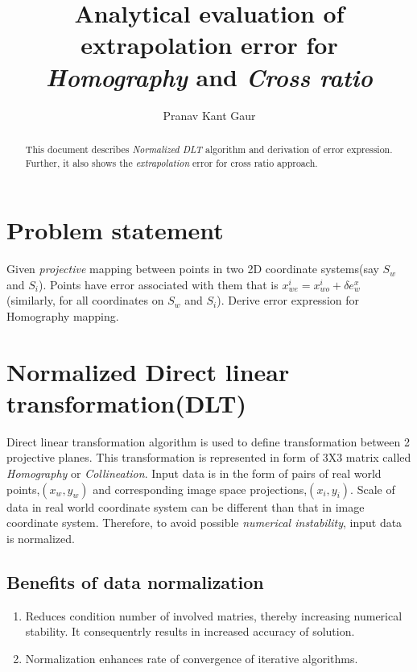 \documentclass{article}
\begin{document}
\title{Analytical evaluation of extrapolation error for \textit{Homography} and \textit{Cross ratio}}

\author{Pranav Kant Gaur}

\maketitle

\begin{abstract}
This document describes \textit{Normalized DLT} algorithm and derivation of error expression. Further, it also shows the \textit{extrapolation} error for cross ratio approach. 
\end{abstract}

\section{Problem statement}
Given \textit{projective} mapping between points in two 2D coordinate systems(say $S_w$ and $S_i$). Points have error associated with them that is $x_{we}^i=x_{wo}^i+\delta e_w^x$ (similarly, for all coordinates on $S_w$ and $S_i$). Derive error expression for Homography mapping.

\section{Normalized Direct linear transformation(DLT)}
Direct linear transformation algorithm is used to define transformation between 2 projective planes. This transformation is represented in form of 3X3 matrix called \textit{Homography} or \textit{Collineation}. Input data is in the form of pairs of real world points,$(x_w,y_w)$ and corresponding image space projections,$(x_i,y_i)$. Scale of data in real world coordinate system can be different than that in image coordinate system. Therefore, to avoid possible \textit{numerical instability}, input data is normalized.

\subsection{Benefits of data normalization}
\begin{enumerate}
\item Reduces condition number of involved matries, thereby increasing numerical stability. It consequentrly results in increased accuracy of solution.
\item Normalization enhances rate of convergence of iterative algorithms.
\end{enumerate}
\end{document}

